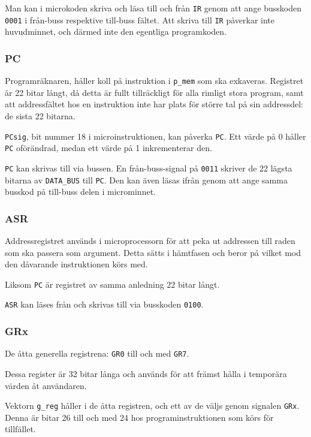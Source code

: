 \documentclass[]{article}
\begin{document}
Man kan i microkoden skriva och läsa till och från \texttt{IR} genom att ange busskoden \texttt{0001} i från-buss respektive till-buss fältet. Att skriva till \texttt{IR} påverkar inte huvudminnet, och därmed inte den egentliga programkoden.

\subsubsection{PC}

Programräknaren, håller koll på instruktion i \texttt{p\_mem} som ska exkaveras. Registret är 22 bitar långt, då detta är fullt tillräckligt för alla rimligt stora program, samt att addressfältet hos en instruktion inte har plats för större tal på sin addressdel: de sista 22 bitarna.

\texttt{PCsig}, bit nummer 18 i microinstruktionen, kan påverka \texttt{PC}. Ett värde på 0 håller \texttt{PC} oförändrad, medan ett värde på 1 inkrementerar den.

\texttt{PC} kan skrivas till via bussen. En från-buss-signal på \texttt{0011} skriver de 22 lägsta bitarna av \texttt{DATA\_BUS} till \texttt{PC}. Den kan även läsas ifrån genom att ange samma busskod på till-buss delen i microminnet.

\subsubsection{ASR}

Addressregistret används i microprocessorn för att peka ut addressen till raden som ska passera som argument. Detta sätts i hämtfasen och beror på vilket mod den dåvarande instruktionen körs med.

Liksom \texttt{PC} är registret av samma anledning 22 bitar långt.

\texttt{ASR} kan läses från och skrivas till via busskoden \texttt{0100}.

\subsubsection{GRx}

De åtta generella registrena: \texttt{GR0} till och med \texttt{GR7}.

Dessa register är 32 bitar långa och används för att främst hålla i temporära värden åt användaren.

Vektorn \texttt{g\_reg} håller i de åtta registren, och ett av de väljs genom signalen \texttt{GRx}. Denna är bitar 26 till och med 24 hos programinstruktionen som körs för tillfället.
\end{document}
